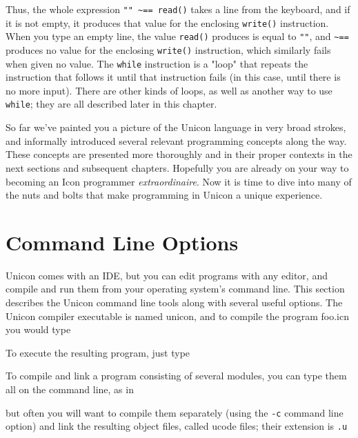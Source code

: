 Thus, the whole expression \texttt{"" \~{}==
read()} takes a line from the keyboard, and if it is not empty, it
produces that value for the enclosing \texttt{write()} instruction.
When you type an empty line, the value \texttt{read()} produces is
equal to \texttt{""}, and \texttt{\~{}==}
produces no value for the enclosing \texttt{write()} instruction, which
similarly fails when given no value. The \texttt{while}
instruction is a "loop" that
repeats the instruction that follows it until that instruction fails
(in this case, until there is no more input). There are other kinds of
loops, as well as another way to use \texttt{while}; they are all
described later in this chapter.

So far we've painted you a picture of the Unicon
language in very broad strokes, and informally introduced several
relevant programming concepts along the way. These concepts are
presented more thoroughly and in their proper contexts in the next
sections and subsequent chapters. Hopefully you are already on your way
to becoming an Icon programmer \textit{extraordinaire}. Now it is time
to dive into many of the nuts and bolts that make programming in Unicon
a unique experience.

\section{Command Line Options}

Unicon comes with an IDE, but you can edit programs with any
editor, and compile and run them from your operating
system's command line. This section describes the
Unicon command line tools along with several useful options. The Unicon
compiler executable is named unicon, and to compile the program foo.icn
you would type


\noindent To execute the resulting program, just type


To compile and link a program consisting of several modules, you can
type them all on the command line, as in


\noindent but often you will want to compile them separately
(using the \texttt{-c} command line option) and link the resulting object
files, called ucode files; their extension is \texttt{.u}


